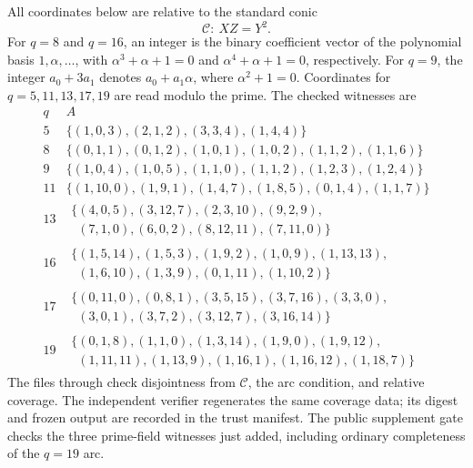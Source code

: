 \documentclass[11pt]{article}
\theoremstyle{definition}
\theoremstyle{remark}
\newcommand{\cC}{\mathcal{C}}
\begin{document}
All coordinates below are relative to the standard conic
\[
 \cC:\ XZ=Y^2.
\]
For \(q=8\) and \(q=16\), an integer is the binary coefficient vector of
the polynomial basis \(1,\alpha,\ldots\), with
\(\alpha^3+\alpha+1=0\) and \(\alpha^4+\alpha+1=0\), respectively.  For
\(q=9\), the integer \(a_0+3a_1\) denotes \(a_0+a_1\alpha\), where
\(\alpha^2+1=0\).  Coordinates for \(q=5,11,13,17,19\) are read modulo
the prime.
The checked witnesses are
\[
\begin{array}{c|l}
q& A\\ \hline
5&
\{(1,0,3),(2,1,2),(3,3,4),(1,4,4)\}\\[2pt]
8&
\{(0,1,1),(0,1,2),(1,0,1),(1,0,2),(1,1,2),(1,1,6)\}\\[2pt]
9&
\{(1,0,4),(1,0,5),(1,1,0),(1,1,2),(1,2,3),(1,2,4)\}\\[2pt]
11&
\{(1,10,0),(1,9,1),(1,4,7),(1,8,5),(0,1,4),(1,1,7)\}\\[2pt]
13&
\begin{gathered}
\{(4,0,5),(3,12,7),(2,3,10),(9,2,9),\\
\phantom{\{}(7,1,0),(6,0,2),(8,12,11),(7,11,0)\}
\end{gathered}\\[2pt]
16&
\begin{gathered}
\{(1,5,14),(1,5,3),(1,9,2),(1,0,9),(1,13,13),\\
\phantom{\{}(1,6,10),(1,3,9),(0,1,11),(1,10,2)\}
\end{gathered}\\[2pt]
17&
\begin{gathered}
\{(0,11,0),(0,8,1),(3,5,15),(3,7,16),(3,3,0),\\
\phantom{\{}(3,0,1),(3,7,2),(3,12,7),(3,16,14)\}
\end{gathered}\\[2pt]
19&
\begin{gathered}
\{(0,1,8),(1,1,0),(1,3,14),(1,9,0),(1,9,12),\\
\phantom{\{}(1,11,11),(1,13,9),(1,16,1),(1,16,12),(1,18,7)\}
\end{gathered}
\end{array}
\]
The files
 through
 check disjointness from \(\cC\), the arc condition, and
relative coverage.  The independent verifier
regenerates the same coverage data; its digest and frozen output are
recorded in the trust manifest.
The public supplement gate
checks the three prime-field witnesses just added, including ordinary
completeness of the \(q=19\) arc.
\end{document}
